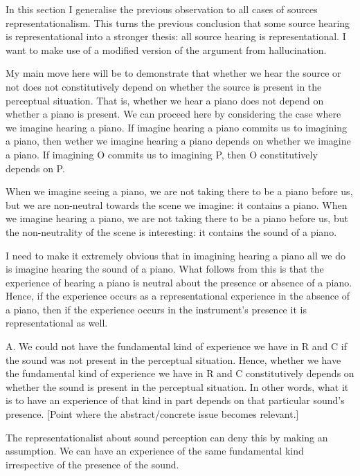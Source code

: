 \documentclass[sloppy, journal, git, bytitle, dodraft]{humapap}
\begin{document}
In this section I generalise the previous observation to all cases of sources representationalism. This turns the previous conclusion that some source hearing is representational into a stronger thesis: all source hearing is representational. I want to make use of a modified version of the argument from hallucination. 



My main move here will be to demonstrate that whether we hear the source or not does not constitutively depend on whether the source is present in the perceptual situation. That is, whether we hear a piano does not depend on whether a piano is present. We can proceed here by considering the case where we imagine hearing a piano. If imagine hearing a piano commits us to imagining a piano, then wether we imagine hearing a piano depends on whether we imagine a piano. If imagining O commits us to imagining P, then O constitutively depends on P. 




When we imagine seeing a piano, we are not taking there to be a piano before us, but we are non-neutral towards the scene we imagine: it contains a piano. 
When we imagine hearing a piano, we are not taking there to be a piano before us, but the non-neutrality of the scene is interesting: it contains the sound of a piano. 

I need to make it extremely obvious that in imagining hearing a piano all we do is imagine hearing the sound of a piano. What follows from this is that the experience of hearing a piano is neutral about the presence or absence of a piano. Hence, if the experience occurs as a representational experience in the absence of a piano, then if the experience occurs in the instrument’s presence it is representational as well. 



A. We could not have the fundamental kind of experience we have in R and C if the sound was not present in the perceptual situation. Hence, whether we have the fundamental kind of experience we have in R and C constitutively depends on whether the sound is present in the perceptual situation. In other words, what it is to have an experience of that kind in part depends on that particular sound's presence. [Point where the abstract/concrete issue becomes relevant.]

The representationalist about sound perception can deny this by making an assumption. We can have an experience of the same fundamental kind irrespective of the presence of the sound. 
\end{document}
